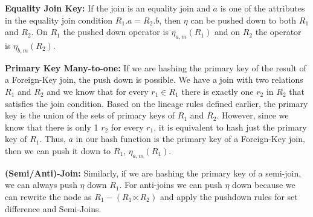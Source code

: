\textbf{Equality Join Key: } If the join is an equality join and $a$ is one of the attributes in the equality join condition $R_1.a = R_2.b$, then $\eta$ can be pushed down to both $R_1$ and $R_2$. On $R_1$ the pushed down operator is $\eta_{a, m}(R_1)$ and on $R_2$ the operator is $\eta_{b, m}(R_2)$.

\textbf{Primary Key Many-to-one: } If we are hashing the primary key of the result of a Foreign-Key join, the push down is possible. We have a join with two relations $R_1$ and $R_2$ and we know that for every $r_1 \in R_1$ there is exactly one $r_2$ in $R_2$ that satisfies the join condition. Based on the lineage rules defined earlier, the primary key is the union of the sets of primary keys of $R_1$ and $R_2$. However, since we know that there is only 1 $r_2$ for every $r_1$, it is equivalent to hash just the primary key of $R_1$. Thus, $a$ in our hash function is the primary key of a Foreign-Key join, then we can push it down to $R_1$, $\eta_{a, m}(R_1)$. 

\textbf{(Semi/Anti)-Join: } Similarly, if we are hashing the primary key of a semi-join, we can always push $\eta$ down $R_1$. For anti-joins we can push $\eta$ down because we can rewrite the node as $R_1 - (R_1 \ltimes R_2) $ and apply the pushdown rules for set difference and Semi-Joins.

